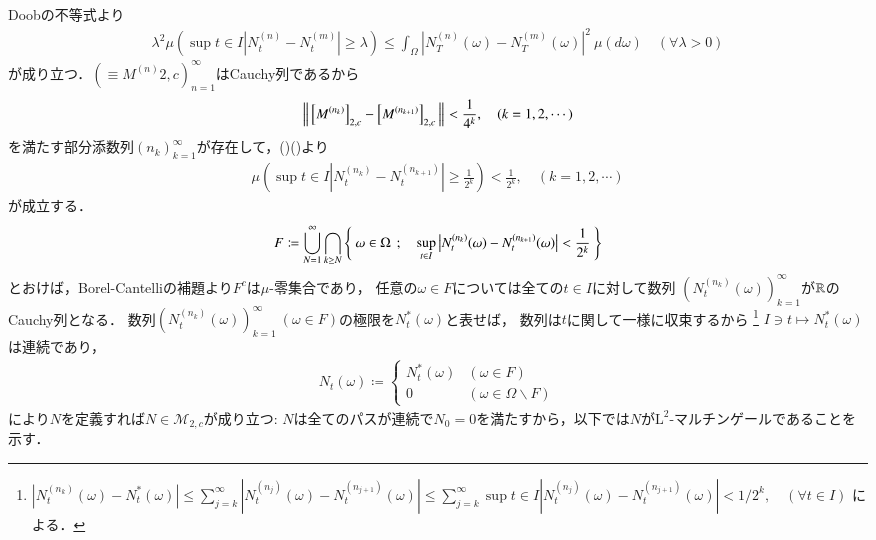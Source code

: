 \begin{prf}
		Doobの不等式より
		\begin{align}
			\lambda^2 \mu\left(\sup{t \in I}{\left| N^{(n)}_t - N^{(m)}_t \right| \geq \lambda}\right) 
			\leq \int_{\Omega} \left| N^{(n)}_T(\omega) - N^{(m)}_T(\omega) \right|^2\ \mu(d\omega)
			\quad (\forall \lambda > 0)
			\label{eq:prp_M_2_c_hilbert_2}
		\end{align}
		が成り立つ．$\left(\equiv{M^{(n)}}{2,c}\right)_{n=1}^{\infty}$はCauchy列であるから
		\begin{align}
			\left\|\, \left[M^{(n_k)}\right]_{2,c} - \left[M^{(n_{k+1})}\right]_{2,c}\, \right\|_{} < \frac{1}{4^k}, \quad (k = 1,2,\cdots) \label{eq:mart_hilbert_1}
		\end{align}
		を満たす部分添数列$(n_k)_{k=1}^{\infty}$が存在して，()()より
		\begin{align}
			\mu\left(\sup{t \in I}{\left| N^{(n_k)}_t - N^{(n_{k+1})}_t \right| \geq \frac{1}{2^k}}\right) < \frac{1}{2^k}, \quad (k=1,2,\cdots)
		\end{align}
		が成立する．
		\begin{align}
			F \coloneqq \bigcup_{N=1}^{\infty} \bigcap_{k \geq N} 
				\left\{\ \omega \in \Omega\ \, ; \quad \operatorname*{sup}_{t \in I} \left| N^{(n_k)}_t(\omega) - N^{(n_{k+1})}_t(\omega) \right| < \frac{1}{2^k}\ \right\}
		\end{align}
		とおけば，Borel-Cantelliの補題より$F^c$は$\mu$-零集合であり，
		任意の$\omega \in F$については全ての$t \in I$に対して数列
		$\left(N^{(n_k)}_t(\omega)\right)_{k=1}^{\infty}$が$\mathbb{R}$のCauchy列となる．
		数列$\left(N^{(n_k)}_t(\omega)\right)_{k=1}^{\infty}\ (\omega \in F)$の極限を$N^*_t(\omega)$と表せば，
		数列は$t$に関して一様に収束するから
		\footnote{
			$\left| N^{(n_k)}_t(\omega) - N^*_t(\omega) \right| \leq \sum_{j=k}^{\infty} \left| N^{(n_j)}_t(\omega) - N^{(n_{j+1})}_t(\omega) \right|
			\leq \sum_{j=k}^{\infty} \sup{t \in I}{\left| N^{(n_j)}_t(\omega) - N^{(n_{j+1})}_t(\omega) \right|} < 1/2^k, \quad (\forall t \in I)$
			による．
		}
		$I \ni t \longmapsto N^*_t(\omega)$は連続であり，
		\begin{align}
			N_t(\omega) \coloneqq 
			\begin{cases}
				N^*_t(\omega) & (\omega \in F) \\
				0 & (\omega \in \Omega \backslash F)
			\end{cases}
		\end{align}
		により$N$を定義すれば$N \in \mathcal{M}_{2,c}$が成り立つ:
		$N$は全てのパスが連続で$N_0 = 0$を満たすから，以下では$N$が$\mathrm{L}^2$-マルチンゲールであることを示す．

\end{prf}
